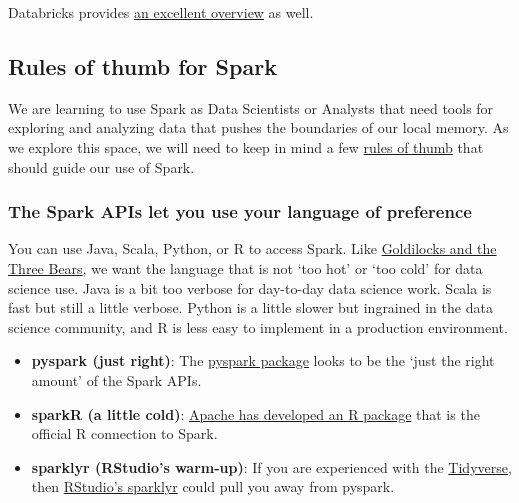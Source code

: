 \documentclass[
  letterpaper,
  DIV=11,
  numbers=noendperiod]{scrreprt}
\providecommand{\tightlist}{%
  \setlength{\itemsep}{0pt}\setlength{\parskip}{0pt}}\usepackage{longtable,booktabs,array}
\begin{document}
Databricks provides \href{https://databricks.com/spark/about}{an
excellent overview} as well.

\hypertarget{rules-of-thumb-for-spark}{%
\subsection{Rules of thumb for Spark}\label{rules-of-thumb-for-spark}}

We are learning to use Spark as Data Scientists or Analysts that need
tools for exploring and analyzing data that pushes the boundaries of our
local memory. As we explore this space, we will need to keep in mind a
few \href{https://en.wikipedia.org/wiki/Rule_of_thumb}{rules of thumb}
that should guide our use of Spark.

\hypertarget{the-spark-apis-let-you-use-your-language-of-preference}{%
\subsubsection{The Spark APIs let you use your language of
preference}\label{the-spark-apis-let-you-use-your-language-of-preference}}

You can use Java, Scala, Python, or R to access Spark. Like
\href{https://en.wikipedia.org/wiki/Goldilocks_principle}{Goldilocks and
the Three Bears}, we want the language that is not `too hot' or `too
cold' for data science use. Java is a bit too verbose for day-to-day
data science work. Scala is fast but still a little verbose. Python is a
little slower but ingrained in the data science community, and R is less
easy to implement in a production environment.

\begin{itemize}
\tightlist
\item
  \textbf{pyspark (just right)}: The
  \href{https://spark.apache.org/docs/latest/api/python/index.html}{pyspark
  package} looks to be the `just the right amount' of the Spark APIs.\\
\item
  \textbf{sparkR (a little cold)}:
  \href{https://spark.apache.org/docs/latest/sparkr.html}{Apache has
  developed an R package} that is the official R connection to Spark.
\item
  \textbf{sparklyr (RStudio's warm-up)}: If you are experienced with the
  \href{https://www.tidyverse.org/}{Tidyverse}, then
  \href{https://spark.rstudio.com/}{RStudio's sparklyr} could pull you
  away from pyspark.
\end{itemize}
\end{document}
